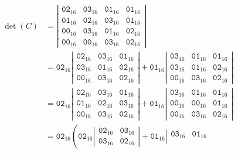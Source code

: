 \begin{align*}
\det(C)
&=
\left|
\begin{matrix}
\texttt{02}_{16}&\texttt{03}_{16}&\texttt{01}_{16}&\texttt{01}_{16}\\
\texttt{01}_{16}&\texttt{02}_{16}&\texttt{03}_{16}&\texttt{01}_{16}\\
\texttt{00}_{16}&\texttt{03}_{16}&\texttt{01}_{16}&\texttt{02}_{16}\\
\texttt{00}_{16}&\texttt{00}_{16}&\texttt{03}_{16}&\texttt{02}_{16}
\end{matrix}
\right|
\\
&=
\texttt{02}_{16}
\left|
\begin{matrix}
\texttt{02}_{16}&\texttt{03}_{16}&\texttt{01}_{16}\\
\texttt{03}_{16}&\texttt{01}_{16}&\texttt{02}_{16}\\
\texttt{00}_{16}&\texttt{03}_{16}&\texttt{02}_{16}
\end{matrix}
\right|
+
\texttt{01}_{16}
\left|
\begin{matrix}
\texttt{03}_{16}&\texttt{01}_{16}&\texttt{01}_{16}\\
\texttt{03}_{16}&\texttt{01}_{16}&\texttt{02}_{16}\\
\texttt{00}_{16}&\texttt{03}_{16}&\texttt{02}_{16}
\end{matrix}
\right|
\\
&=
\texttt{02}_{16}
\left|
\begin{matrix}
\texttt{02}_{16}&\texttt{03}_{16}&\texttt{01}_{16}\\
\texttt{01}_{16}&\texttt{02}_{16}&\texttt{03}_{16}\\
\texttt{00}_{16}&\texttt{03}_{16}&\texttt{02}_{16}
\end{matrix}
\right|
+
\texttt{01}_{16}
\left|
\begin{matrix}
\texttt{03}_{16}&\texttt{01}_{16}&\texttt{01}_{16}\\
\texttt{00}_{16}&\texttt{00}_{16}&\texttt{01}_{16}\\
\texttt{00}_{16}&\texttt{03}_{16}&\texttt{02}_{16}
\end{matrix}
\right|
\\
&=
\texttt{02}_{16}
\left(
\texttt{02}_{16}
\left|
\begin{matrix}
\texttt{02}_{16}&\texttt{03}_{16}\\
\texttt{03}_{16}&\texttt{02}_{16}
\end{matrix}
\right|
+
\texttt{01}_{16}
\left|
\begin{matrix}
\texttt{03}_{16}&\texttt{01}_{16}\\

\end{matrix}
\end{align*}
